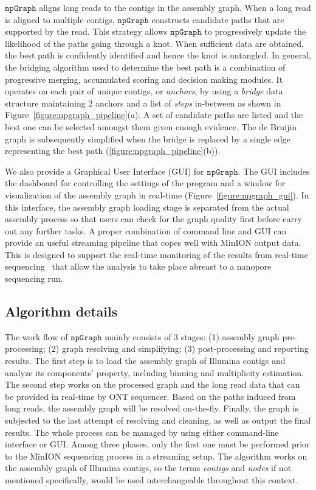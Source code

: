 \documentclass[10pt,letterpaper]{article}
\newcommand{\npgraph}{$\mathtt{npGraph}$}
\begin{document}
\npgraph{} aligns long reads to the contigs in the assembly graph. When a long read is aligned
to multiple contigs, \npgraph{} constructs candidate paths that are supported by the read. This strategy allows \npgraph{} to progressively update the likelihood of the paths going through a knot.
When sufficient data are obtained, the best path is confidently identified and hence the knot is untangled.
In general, the bridging algorithm used to determine the best path is a combination of progressive merging, accumulated scoring and decision making modules.
It operates on each pair of unique contigs, or \emph{anchors}, by using a \emph{bridge} data structure maintaining 2 anchors and a list of \emph{steps} in-between as shown in Figure~\ref{figure:npgraph_pipeline}(a). 
A set of candidate paths are listed and the best one can be selected amongst them given enough evidence. 
The de Bruijin graph is subsequently simplified when the bridge is replaced by a single edge representing the best path (\ref{figure:npgraph_pipeline}(b)).


We also provide a Graphical User Interface (GUI) for \npgraph{}. The GUI includes the dashboard for controlling the settings of the program and a window for visualization of the assembly graph 
in real-time (Figure~\ref{figure:npgraph_gui}). 
In this interface, the assembly graph loading stage is separated from the actual assembly process so that users can check for the graph quality first before carry out any further tasks.
A proper combination of command line and GUI can provide an useful streaming pipeline that copes well with MinION output data. This is designed to support the real-time monitoring of
the results from real-time sequencing~\cite{CaoGC2016,Cao2017scaffolding,Nguyen2017barcode} that allow the analysis to take place abreast to a nanopore sequencing run.


\subsection*{Algorithm  details}
The work flow of \npgraph{} mainly consists of 3 stages: (1) assembly graph pre-processing; (2) graph resolving and simplifying; (3) post-processing and reporting results. 
The first step is to load the assembly graph of Illumina contigs and analyze its components' property, including binning and multiplicity estimation.
The second step works on the processed graph and the long read data that can be provided in real-time by ONT sequencer. Based on the paths induced from long reads, the assembly graph will be resolved on-the-fly.
Finally, the graph is subjected to the last attempt of resolving and cleaning, as well as output the final results. The whole process can be managed by using either command-line interface or GUI.
Among three phases, only the first one must be performed prior to the MinION sequencing process in a streaming setup.
The algorithm works on the assembly graph of Illumina contigs, so the terms \emph{contigs} and \emph{nodes} if not mentioned specifically, would be used interchangeable throughout this context.
\end{document}
